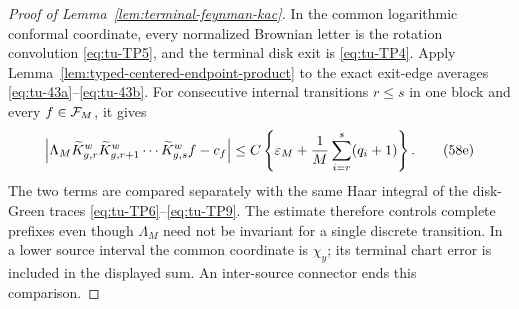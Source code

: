 \begin{proof}[Proof of Lemma~\ref{lem:terminal-feynman-kac}]
In the common logarithmic conformal coordinate, every normalized Brownian
letter is the rotation convolution \eqref{eq:tu-TP5}, and the terminal disk exit is
\eqref{eq:tu-TP4}.  Apply Lemma~\ref{lem:typed-centered-endpoint-product} to the exact
exit-edge averages \eqref{eq:tu-43a}--\eqref{eq:tu-43b}.  For consecutive internal transitions
\(r\le s\) in one block and every \(f\in{\cal F}_M\), it gives
\begin{equation}
 \left|\Lambda_M
   \widetilde K_{g,r}^w\widetilde K_{g,r+1}^w\cdots
   \widetilde K_{g,s}^wf-c_f\right|
 \le C\left\{\varepsilon_M+
       {1\over M}\sum_{i=r}^s(q_i+1)\right\}.              \tag{58e}\label{eq:tu-58e}
\end{equation}
The two terms are compared separately with the same Haar integral of the
disk-Green traces \eqref{eq:tu-TP6}--\eqref{eq:tu-TP9}. The estimate therefore controls complete
prefixes even though \(\Lambda_M\) need not be invariant for a single
discrete transition. In a lower source interval the common coordinate is
\(\chi_y\); its terminal chart error is included in the displayed sum.
An inter-source connector ends this comparison.


\end{proof}
